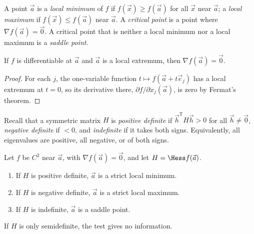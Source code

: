 \begin{definition}
A point $\vec a$ is a \emph{local minimum} of $f$ if $f(\vec x)\ge f(\vec a)$ for all $\vec x$ near $\vec a$; a \emph{local maximum} if $f(\vec x)\le f(\vec a)$ near $\vec a$. A \emph{critical point} is a point where $\nabla f(\vec a)=\vec0$. A critical point that is neither a local minimum nor a local maximum is a \emph{saddle point}.
\end{definition}

\begin{theorem}\label{thm:critical}
If $f$ is differentiable at $\vec a$ and $\vec a$ is a local extremum, then $\nabla f(\vec a)=\vec 0$.
\end{theorem}

\begin{proof}
For each $j$, the one-variable function $t\mapsto f(\vec a+t\vec e_j)$ has a local extremum at $t=0$, so its derivative there, $\partial f/\partial x_j(\vec a)$, is zero by Fermat's theorem.
\end{proof}

Recall that a symmetric matrix $H$ is \emph{positive definite} if $\vec h^{\mathsf T}H\vec h>0$ for all $\vec h\ne\vec 0$, \emph{negative definite} if $<0$, and \emph{indefinite} if it takes both signs. Equivalently, all eigenvalues are positive, all negative, or of both signs.

\begin{theorem}\label{thm:secondtest}
Let $f$ be $C^2$ near $\vec a$, with $\nabla f(\vec a)=\vec0$, and let $H=\Hess f(\vec a)$.
\begin{enumerate}[label=(\alph*)]
  \item If $H$ is positive definite, $\vec a$ is a strict local minimum.
  \item If $H$ is negative definite, $\vec a$ is a strict local maximum.
  \item If $H$ is indefinite, $\vec a$ is a saddle point.
\end{enumerate}
If $H$ is only semidefinite, the test gives no information.
\end{theorem}

